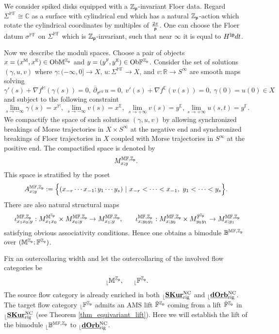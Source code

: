 \documentclass[reqno, 10pt]{amsart}
\numberwithin{equation}{section}
\numberwithin{equation}{section}
\theoremstyle{definition}
\theoremstyle{remark}
\newcommand{\beqn}{\begin{equation*}}
\newcommand{\eeqn}{\end{equation*}}
\newcommand{\ov}{\overline}
\newcommand{\mb}{\mathbb}
\newcommand{\p}{{\sf p}}
\newcommand{\zp}{{{\mb Z}_{\sf p}}}
\newcommand{\ep}{{{\mathbb E}}}
\renewcommand{\outer}{{}_{\lfloor}}
\newcommand{\uds}[1]{\underline{\smash{#1}}}
\begin{document}
We consider spiked disks equipped with a $\zp$-invariant Floer data. Regard $\Sigma^{\mb{MF}} \cong {\mb C}$ as a surface with cylindrical end which has a natural $\zp$-action which rotate the cylindrical coordinates by multiples of $\frac{2\pi}{\p}$. One can choose the Floer datum $\sigma^{\mb{MF}}$ on $\Sigma^{\mb{MF}}$ which is $\zp$-invariant, such that near $\infty$ it is equal to $H^{\natural \p} dt$. 

Now we describe the moduli spaces. Choose a pair of objects $x = (x^{\mb M}, x^{\ep}) \in {\rm Ob} \mb{M}^\zp$ and $y = (y^{\mb F}, y^\ep) \in {\rm Ob}{\mb F}^\zp$. Consider the set of solutions $(\gamma, u, v)$ where $\gamma: (-\infty, 0] \to X$, $u: \Sigma^{\mb{MF}} \to X$, and $v: {\mb R} \to S^\infty$ are smooth maps solving
\beqn
\gamma'(s) + \nabla f^{\mb M}(\gamma(s)) = 0,\ \ov\partial_{\sigma^{\mb{MF}}} u = 0,\ v'(s) + \nabla f^\ep(v(s)) = 0,\ \gamma(0) = u(0) \in X
\eeqn
and subject to the following constraint
\beqn
\lim_{s \to - \infty} \gamma(s) = x^{\mb M},\ \lim_{s \to -\infty} v(s) = x^\ep,\ \lim_{s \to +\infty} v(s) = y^\ep, \lim_{s \to +\infty} u(s,t) = y^{\mb F}.
\eeqn
We compactify the space of such solutions $(\gamma, u, v)$ by allowing synchronized breakings of Morse trajectories in $X \times S^\infty$ at the negative end and synchronized breakings of Floer trajectories in $X$ coupled with Morse trajectories in $S^\infty$ at the positive end. The compactified space is denoted by 
\beqn
M_{x; y}^{\mb{MF}, \zp}.
\eeqn
This space is stratified by the poset
\beqn
A_{x; y}^{\mb{MF}, \zp}:= \Big\{ (x_{-r} \cdots x_{-1}; y_1 \cdots y_s)\ |\ x_{-r} < \cdots < x_{-1},\ y_1 < \cdots < y_s \Big\}.
\eeqn
There are also natural structural maps
\begin{align*}
&\ \iota_{x_1x_0; y}^{\mb{MF}, \zp}: M_{x_1 x_0}^{\mb{M}^\zp} \times M_{x_0; y}^{\mb{MF}, \zp} \to M_{x_1; y}^{\mb{MF}, \zp},\ \ &\ \iota_{x; y_0y_1}^{\mb{MF}, \zp}: M_{x; y_0}^{\mb{MF},\zp}\times M_{y_0 y_1}^{\mb{F}^\zp} \to M_{x; y_1}^{\mb{MF}, \zp}
\end{align*}
satisfying obvious associativity conditions. Hence one obtains a bimodule $\mb{B}^{\mb{MF}, \zp}$ over $(\mb{M}^\zp; \mb{F}^\zp)$. 

Fix an outercollaring width and let the outercollaring of the involved flow categories be
\begin{align*}
&\ \outer \mb{M}^\zp,\ &\ \outer \mb{F}^\zp.
\end{align*}
The source flow category is already enriched in both $\outer \uds{\bf SKur}_{\rm rig}^{\rm NC}$ and $\outer \uds{\bf dOrb}_{\rm rig}^{\rm NC}$. The target flow category $\outer \mb{F}^\zp$ admits an AMS lift $\tilde{\mb F}^\zp$ coming from a lift $\hat{\mb F}^\zp$ in $\outer\uds{\bf SKur}_{\rm rig}^{\rm NC}$ (see Theorem \ref{thm_equivariant_lift}). Here we will establish the lift of the bimodule $\outer {\mb B}^{\mb{MF}, \zp}$ to $\outer \uds{\bf dOrb}_{\rm rig}^{\rm NC}$.
\end{document}
